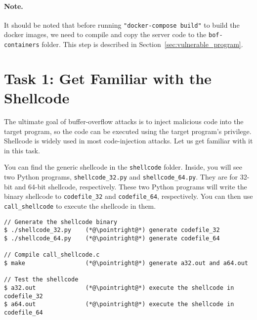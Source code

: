 


\paragraph{Note.} It should be noted that before running 
\texttt{"docker-compose build"} to build the docker
images, we need to compile and copy the server 
code to the \texttt{bof-containers} folder. 
This step is described in Section~\ref{sec:vulnerable_program}.



\section{Task 1: Get Familiar with the Shellcode}

The ultimate goal of buffer-overflow attacks is to inject
malicious code into the target program, so the code can be
executed using the target program's privilege.
Shellcode is widely used in most code-injection attacks.
Let us get familiar with it in this task.




You can find the generic shellcode in the \texttt{shellcode} folder.
Inside, you will see two Python programs, 
\texttt{shellcode\_32.py} and \texttt{shellcode\_64.py}. 
They are for 32-bit and 64-bit shellcode, respectively. 
These two Python programs will
write the binary shellcode to \texttt{codefile\_32}
and \texttt{codefile\_64}, respectively. You can then use 
\texttt{call\_shellcode} to execute the shellcode in them. 


\newcommand{\pointright}{\ding{221}}

\begin{lstlisting}
// Generate the shellcode binary 
$ ./shellcode_32.py    (*@\pointright@*) generate codefile_32
$ ./shellcode_64.py    (*@\pointright@*) generate codefile_64

// Compile call_shellcode.c
$ make                 (*@\pointright@*) generate a32.out and a64.out 

// Test the shellcode 
$ a32.out              (*@\pointright@*) execute the shellcode in codefile_32
$ a64.out              (*@\pointright@*) execute the shellcode in codefile_64
\end{lstlisting}
 

